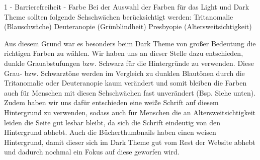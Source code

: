 \documentclass[a4paper]{article}
\begin{document}
\begin{exercise}{1 - Barrierefreiheit - Farbe} 
Bei der Auswahl der Farben für das Light und Dark Theme sollten folgende Sehschwächen berücksichtigt werden:
Tritanomalie (Blauschwäche)
Deuteranopie (Grünblindheit)
Presbyopie (Altersweitsichtigkeit)

Aus diesem Grund war es besonders beim Dark Theme von großer Bedeutung die richtigen Farben zu wählen. 
Wir haben uns an dieser Stelle dazu entschieden, dunkle Grauabstufungen bzw. Schwarz für die Hintergründe zu verwenden. Diese Grau- bzw. Schwarztöne werden im Vergleich zu dunklen Blautönen durch die Tritanomalie oder Deuteranopie kaum verändert und somit bleiben die Farben auch für Menschen mit diesen Sehschwächen fast unverändert (Bsp. Siehe unten). Zudem haben wir uns dafür entschieden eine weiße Schrift auf diesem Hintergrund zu verwenden, sodass auch für Menschen die an Altersweitsichtigkeit leiden die Seite gut lesbar bleibt, da sich die Schrift eindeutig von den Hintergrund abhebt. Auch die Bücherthumbnails haben einen weisen Hintergrund, damit dieser sich im Dark Theme gut vom Rest der Website abhebt und dadurch nochmal ein Fokus auf diese geworfen wird.


\end{exercise}
\end{document}
